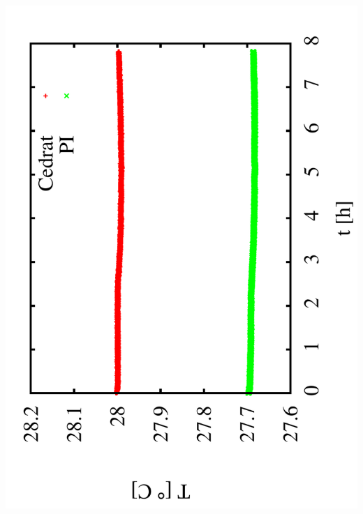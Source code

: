 \documentclass[a4paper,11pt]{book}
\begin{document}
 \includegraphics[angle=-90,scale=0.18]{image_ai_31b.pdf}\\
\end{document}
